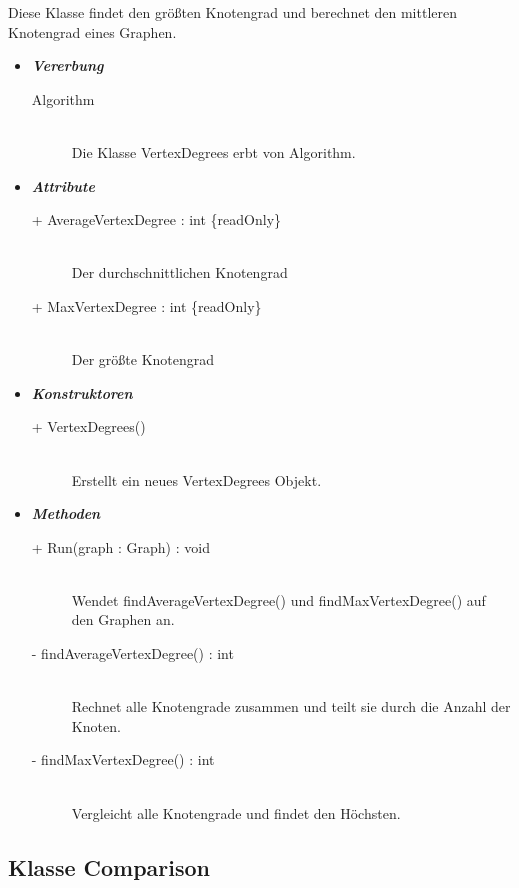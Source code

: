 \documentclass[13pt]{scrreprt}
\begin{document}
	Diese Klasse findet den größten Knotengrad und berechnet den mittleren Knotengrad eines Graphen. 
	\begin{itemize}[label = {$\circ$}]
		\item {\large \textbf{\textit{Vererbung}}\par}
		\begin{description}
			\item[Algorithm] \hfill \\Die Klasse VertexDegrees erbt von Algorithm.
		\end{description}
		\item {\large \textbf{\textit{Attribute}}\par}
		\begin{description}
			\item [+ AverageVertexDegree : int \{readOnly\}] \hfill \\Der durchschnittlichen Knotengrad
			\item [+ MaxVertexDegree : int \{readOnly\}] \hfill \\Der größte Knotengrad
		\end{description}
		\item {\large \textbf{\textit{Konstruktoren}}\par}
		\begin{description}
			\item [+ VertexDegrees()] \hfill \\Erstellt ein neues VertexDegrees Objekt.
		\end{description}
		\item {\large \textbf{\textit{Methoden}}\par}
		\begin{description}
			\item [+ Run(graph : Graph) : void] \hfill \\Wendet findAverageVertexDegree() und findMaxVertexDegree() auf den Graphen an.
			\item [- findAverageVertexDegree() : int] \hfill \\Rechnet alle Knotengrade zusammen und teilt sie durch die Anzahl der Knoten.
			\item [- findMaxVertexDegree() : int] \hfill \\Vergleicht alle Knotengrade und findet den Höchsten.
		\end{description}
	\end{itemize}

\subsection{Klasse Comparison}
\end{document}
